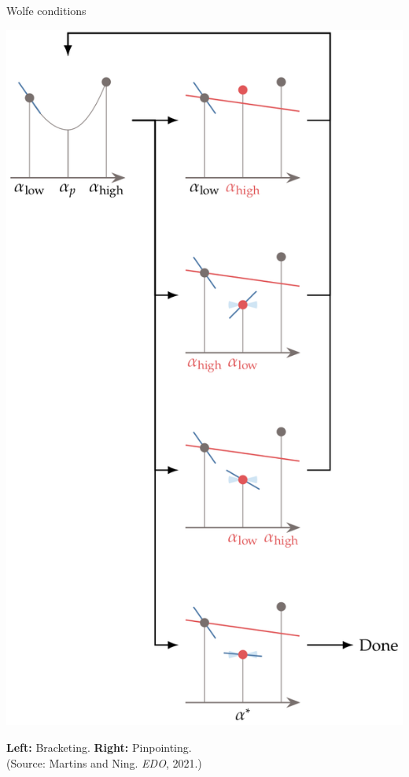 \documentclass[11pt,compress,t,notes=noshow, xcolor=table]{beamer}
\begin{document}
\begin{vbframe}{Wolfe conditions}
\begin{center}
            \includegraphics[height=0.5\textheight,keepaspectratio]{figure_man/wolfe_pinpointing.png} \\
            
            \medskip
            
            {\footnotesize \textbf{Left:} Bracketing.
                \textbf{Right:} Pinpointing. \\
                (Source: Martins and Ning. \textit{EDO}, 2021.)}
        \end{center}
	\end{vbframe}
\end{document}
